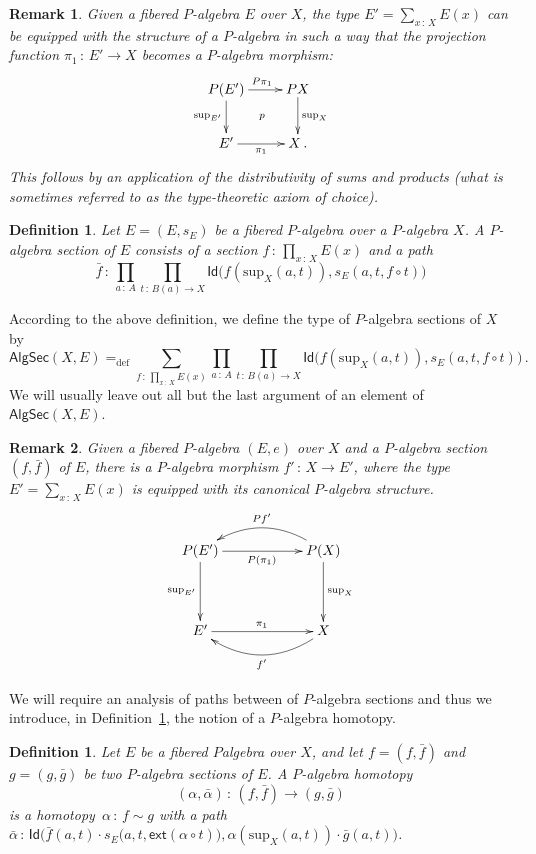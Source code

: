 \documentclass[10pt,a4paper,oneside,reqno]{amsart}
\theoremstyle{mythm}
\theoremstyle{mydef}
\newtheorem{definition}[theorem]{Definition}
\theoremstyle{myrmk}
\newtheorem*{remark*}{Remark}
\newcommand{\ie}{\text{i.e.\ }}
\newcommand{\defeq}{=_{\mathrm{def}}}
\newcommand{\co}{\,{:}\,}
\newcommand{\ct}{\cdot}
\newcommand{\ext}{\mathsf{ext}}
\newcommand{\Id}{\mathsf{Id}}
\renewcommand{\sup}{\mathrm{sup}}
\newcommand{\PalgSec}{\mathsf{AlgSec}}
\begin{document}
\begin{remark*}\label{lem:fibalg}
Given a fibered $P$-algebra $E$ over $X$, the type $E' =  \sum_{x \co  X} E(x)$ can be equipped with the structure of a $P$-algebra in such a way that  the projection function $\pi_1 \co E'\to X$ becomes a $P$-algebra morphism:
\[
\xymatrix{
P(E') \ar[r]^{P\pi_1} \ar[d]_-{\sup_{E'}} \ar@{}[rd]|{p} & PX \ar[d]^{\sup_X} \\ 
E'  \ar[r]_-{\pi_1} & X \, .}
 \]
 This follows by an application of the distributivity of sums and products (\ie what is sometimes
referred to as the type-theoretic axiom of choice). 
\end{remark*}

\begin{definition} \label{def:fibalgsection} Let $E = (E, s_E)$ be a fibered $P$-algebra over a $P$-algebra $X$.  
A \emph{$P$-algebra section} of $E$ consists of a section $f \co \prod_{x \co X} E(x)$ and a path
\[ 
\bar{f} \co \prod_{a \co A} \prod_{t \co B(a) \to X} \Id \big( f(\sup_X(a,t)), s_E(a, t, f \circ t) \big)
\]
\end{definition} 

According to the above definition, we define the type of $P$-algebra sections of $X$ by
\[ 
\PalgSec(X,E)  \defeq \sum_{f  \co \prod_{x \co X} E(x)}\prod_{a \co A} \prod_{t \co B(a) \to X} 
\Id\big(   f(\sup_X(a,t)) ,  s_E(a,t,f  \circ t) \big) \, .
\]
We will usually leave out all but the last argument of an element of $\PalgSec(X,E)$. 



\begin{remark*}
Given a fibered $P$-algebra $(E, e)$ over $X$ and a $P$-algebra section $(f, \bar{f})$ of $E$, there is a $P$-algebra 
morphism $f' \co X \to E'$, where the type $E' = \sum_{x \co X} E(x)$ is equipped with its canonical 
$P$-algebra structure. 
\[
\xymatrix@C=2cm@R=1.5cm{
P(E')  \ar[d]_-{\sup_{E'}}   \ar[r]_{P(\pi_1)}   & P(X)  \ar[d]^-{\sup_X}   \ar@/_1.4pc/[l]_{Pf'}  \\ 
E'  \ar[r]^{\pi_1}    & X \ar@/^1.4pc/[l]^{f'} }
 \]
\end{remark*}



We will require an analysis of paths between of $P$-algebra sections and thus we introduce, in Definition~\ref{def:W2cellsection}, the
notion of a $P$-algebra homotopy.

\begin{definition} \label{def:W2cellsection} Let $E$ be a fibered $P$algebra over $X$, and let $f = (f, \bar{f})$ and $g = (g, \bar{g})$ be two $P$-algebra sections of $E$.  A \emph{$P$-algebra homotopy} 
\[
(\alpha , \bar{\alpha}) \co (f, \bar{f})  \rightarrow (g, \bar{g})
\] 
is a homotopy~$\alpha \co f \sim g$ with a path
$\bar{\alpha} \co 
\Id\big( \bar{f}(a,t)  \ct s_E\big(a,t, \ext (\alpha \circ t) \big),
\alpha(\sup_X(a,t)) \ct \bar{g}(a,t) \big)$. 
\end{definition} 
\end{document}
